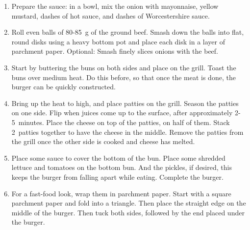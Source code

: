 \begin{enumerate}
    \item Prepare the sauce: in a bowl, mix the onion with mayonnaise, yellow mustard, dashes of hot sauce, and dashes of Worcestershire sauce.
    \item Roll even balls of 80-85~g of the ground beef. Smash down the balls into flat, round disks using a heavy bottom pot and place each disk in a layer of parchment paper. Optional: Smash finely slices onions with the beef.
    \item Start by buttering the buns on both sides and place on the grill. Toast the buns over medium heat. Do this before, so that once the meat is done, the burger can be quickly constructed.
    \item Bring up the heat to high, and place patties on the grill. Season the patties on one side. Flip when juices come up to the surface, after approximately 2-5~minutes. Place the cheese on top of the patties, on half of them. Stack 2~patties together to have the cheese in the middle. Remove the patties from the grill once the other side is cooked and cheese has melted.
    \item Place some sauce to cover the bottom of the bun. Place some shredded lettuce and tomatoes on the bottom bun. And the pickles, if desired, this keeps the burger from falling apart while eating.
    Complete the burger.
    \item For a fast-food look, wrap them in parchment paper. Start with a square parchment paper and fold into a triangle. Then place the straight edge on the middle of the burger. Then tuck both sides, followed by the end placed under the burger.
\end{enumerate}


